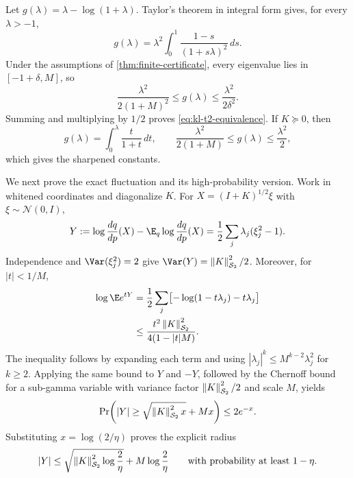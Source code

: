 Let $g(\lambda)=\lambda-\log(1+\lambda)$. Taylor's theorem in integral form
gives, for every $\lambda>-1$,
\begin{equation}
  g(\lambda)
  =\lambda^2\int_0^1
    \frac{1-s}{(1+s\lambda)^2}\,ds.
  \label{eq:g-integral-representation}
\end{equation}
Under the assumptions of \cref{thm:finite-certificate}, every eigenvalue lies
in $[-1+\delta,M]$, so
\begin{equation}
  \frac{\lambda^2}{2(1+M)^2}
  \le g(\lambda)
  \le \frac{\lambda^2}{2\delta^2}.
\end{equation}
Summing and multiplying by $1/2$ proves
\cref{eq:kl-t2-equivalence}. If $K\succeq0$, then
\begin{equation}
  g(\lambda)=\int_0^\lambda\frac{t}{1+t}\,dt,
  \qquad
  \frac{\lambda^2}{2(1+M)}
  \le g(\lambda)\le\frac{\lambda^2}{2},
\end{equation}
which gives the sharpened constants.

We next prove the exact fluctuation and its high-probability version. Work in
whitened coordinates and diagonalize $K$. For
$X=(I+K)^{1/2}\xi$ with $\xi\sim\mathcal N(0,I)$,
\begin{equation}
  Y:=\log\frac{dq}{dp}(X)
    -\E_q\log\frac{dq}{dp}(X)
  =\frac12\sum_j\lambda_j(\xi_j^2-1).
  \label{eq:centered-log-rn-chaos}
\end{equation}
Independence and $\Var(\xi_j^2)=2$ give
$\Var(Y)=\hsnorm{K}^2/2$. Moreover, for $|t|<1/M$,
\begin{align}
  \log\E e^{tY}
  &=\frac12\sum_j\bigl[-\log(1-t\lambda_j)-t\lambda_j\bigr] \\
  &\le
    \frac{t^2\hsnorm{K}^2}{4(1-|t|M)}.
  \label{eq:centered-log-rn-mgf}
\end{align}
The inequality follows by expanding each term and using
$|\lambda_j|^k\le M^{k-2}\lambda_j^2$ for $k\ge2$. Applying the same bound
to $Y$ and $-Y$, followed by the Chernoff bound for a sub-gamma variable with
variance factor $\left\lVert K \right\rVert_{\mathcal{S}_{2}}^2/2$ and scale $M$, yields
\begin{equation}
  \Pr\!\left(
    |Y|\ge\sqrt{\left\lVert K \right\rVert_{\mathcal{S}_{2}}^2x}+Mx
  \right)\le2e^{-x}.
\end{equation}
Substituting $x=\log(2/\eta)$ proves
the explicit radius
\begin{equation}
  |Y|
  \le
  \sqrt{\left\lVert K \right\rVert_{\mathcal{S}_{2}}^2\log\frac{2}{\eta}}
  +M\log\frac{2}{\eta}
  \qquad\text{with probability at least }1-\eta.
  \label{eq:finite-certificate-radius}
\end{equation}

